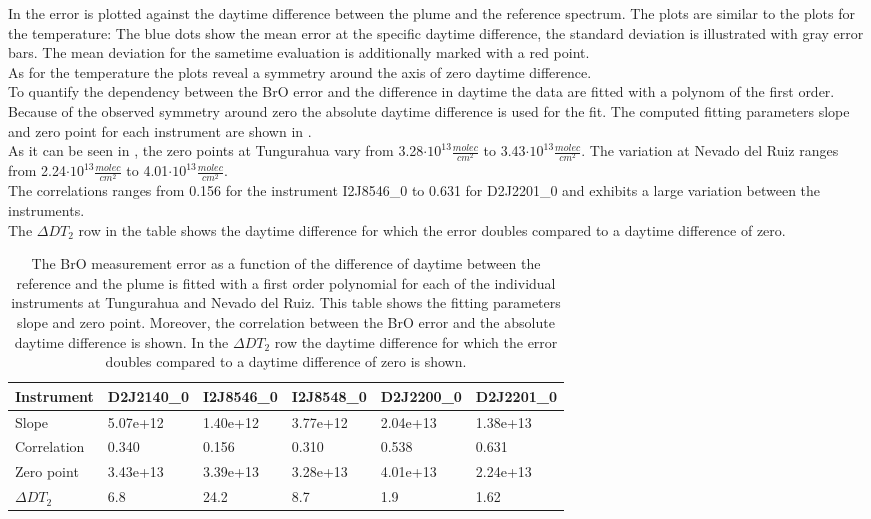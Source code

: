 In  the  error is plotted against the daytime difference between the plume and the reference spectrum. The plots are similar to the plots for the temperature: The blue dots show the mean  error at the specific daytime difference, the standard deviation is illustrated with gray error bars. The mean  deviation for the sametime evaluation is additionally marked with a red point. \\
As for the temperature the plots reveal a symmetry around the axis of zero daytime difference.\\
%
To quantify the dependency between the BrO error and the difference in daytime the data are fitted with a polynom of the first order. Because of the observed symmetry around zero the absolute daytime difference is used for the fit. The computed fitting parameters slope and zero point for each instrument are shown in . \\
%
As it can be seen in , the zero points at Tungurahua vary from 3.28$\cdot10^{13}\frac{molec}{cm^2}$ to 3.43$\cdot10^{13}\frac{molec}{cm^2}$. The variation at Nevado del Ruiz ranges from  2.24$\cdot10^{13}\frac{molec}{cm^2}$ to 4.01$\cdot10^{13}\frac{molec}{cm^2}$. \\
The correlations ranges from 0.156 for the instrument I2J8546\_0 to  0.631 for D2J2201\_0 and exhibits a large variation between the instruments.\\
The $\Delta DT_{2}$ row in the table shows the daytime difference for which the error doubles compared to a daytime difference of zero.
	\begin{table}[h]
	\centering
	\begin{tabular}{|p{2cm}|p{2.15cm}|p{2.15cm}|p{2.15cm}|p{2.15cm}|p{2.15cm}|}
		Instrument	&D2J2140\_0&I2J8546\_0& I2J8548\_0&D2J2200\_0&D2J2201\_0\\
		\toprule
		Slope&5.07e+12&1.40e+12 &3.77e+12 &2.04e+13& 1.38e+13\\
		\midrule
		Correlation&
		0.340&
		0.156&
		0.310&
		0.538&
		0.631\\
		\midrule
		Zero point& 3.43e+13&3.39e+13&3.28e+13&  4.01e+13&  2.24e+13\\
		\midrule
		$\Delta DT_{2}$&6.8&24.2&8.7&1.9&1.62\\
		\bottomrule
	\end{tabular}
	\label{tab:dtcalc}
	\caption{The BrO measurement error as a function of the difference of daytime between the reference and the plume is fitted with a first order polynomial for each of the individual instruments at Tungurahua and Nevado del Ruiz. This table shows the fitting parameters slope and zero point. Moreover, the correlation between the BrO error and the absolute daytime difference is shown. In the $\Delta DT_{2}$ row the daytime difference for which the error doubles compared to a daytime difference of zero is shown.}
\end{table}

